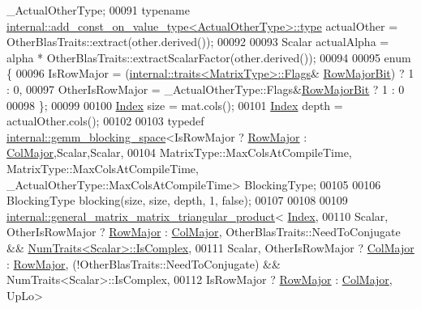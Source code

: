 \begin{DoxyCode}
       \_ActualOtherType;
00091     \textcolor{keyword}{typename} \hyperlink{group___sparse_core___module}{internal::add\_const\_on\_value\_type<ActualOtherType>::type}
       actualOther = OtherBlasTraits::extract(other.derived());
00092 
00093     Scalar actualAlpha = alpha * OtherBlasTraits::extractScalarFactor(other.derived());
00094 
00095     \textcolor{keyword}{enum} \{
00096       IsRowMajor = (\hyperlink{struct_eigen_1_1internal_1_1traits}{internal::traits<MatrixType>::Flags}&
      \hyperlink{group__flags_gae4f56c2a60bbe4bd2e44c5b19cbe8762}{RowMajorBit}) ? 1 : 0,
00097       OtherIsRowMajor = \_ActualOtherType::Flags&\hyperlink{group__flags_gae4f56c2a60bbe4bd2e44c5b19cbe8762}{RowMajorBit} ? 1 : 0
00098     \};
00099 
00100     \hyperlink{namespace_eigen_a62e77e0933482dafde8fe197d9a2cfde}{Index} size = mat.cols();
00101     \hyperlink{namespace_eigen_a62e77e0933482dafde8fe197d9a2cfde}{Index} depth = actualOther.cols();
00102 
00103     \textcolor{keyword}{typedef} \hyperlink{class_eigen_1_1internal_1_1gemm__blocking__space}{internal::gemm\_blocking\_space}<IsRowMajor ? 
      \hyperlink{group__enums_ggaacded1a18ae58b0f554751f6cdf9eb13acfcde9cd8677c5f7caf6bd603666aae3}{RowMajor} : \hyperlink{group__enums_ggaacded1a18ae58b0f554751f6cdf9eb13a0cbd4bdd0abcfc0224c5fcb5e4f6669a}{ColMajor},Scalar,Scalar,
00104               MatrixType::MaxColsAtCompileTime, MatrixType::MaxColsAtCompileTime, 
      \_ActualOtherType::MaxColsAtCompileTime> BlockingType;
00105 
00106     BlockingType blocking(size, size, depth, 1, \textcolor{keyword}{false});
00107 
00108 
00109     \hyperlink{struct_eigen_1_1internal_1_1general__matrix__matrix__triangular__product}{internal::general\_matrix\_matrix\_triangular\_product}<
      \hyperlink{namespace_eigen_a62e77e0933482dafde8fe197d9a2cfde}{Index},
00110       Scalar, OtherIsRowMajor ? \hyperlink{group__enums_ggaacded1a18ae58b0f554751f6cdf9eb13acfcde9cd8677c5f7caf6bd603666aae3}{RowMajor} : \hyperlink{group__enums_ggaacded1a18ae58b0f554751f6cdf9eb13a0cbd4bdd0abcfc0224c5fcb5e4f6669a}{ColMajor},   OtherBlasTraits::NeedToConjugate  &&
       \hyperlink{group___core___module_struct_eigen_1_1_num_traits}{NumTraits<Scalar>::IsComplex},
00111       Scalar, OtherIsRowMajor ? \hyperlink{group__enums_ggaacded1a18ae58b0f554751f6cdf9eb13a0cbd4bdd0abcfc0224c5fcb5e4f6669a}{ColMajor} : \hyperlink{group__enums_ggaacded1a18ae58b0f554751f6cdf9eb13acfcde9cd8677c5f7caf6bd603666aae3}{RowMajor}, (!OtherBlasTraits::NeedToConjugate) &&
       NumTraits<Scalar>::IsComplex,
00112       IsRowMajor ? \hyperlink{group__enums_ggaacded1a18ae58b0f554751f6cdf9eb13acfcde9cd8677c5f7caf6bd603666aae3}{RowMajor} : \hyperlink{group__enums_ggaacded1a18ae58b0f554751f6cdf9eb13a0cbd4bdd0abcfc0224c5fcb5e4f6669a}{ColMajor}, UpLo>

\end{DoxyCode}
